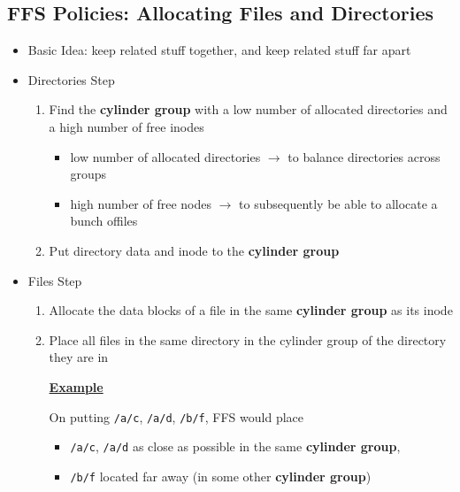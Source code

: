 \documentclass[12pt]{article}
\begin{document}
\subsection{FFS Policies: Allocating Files and Directories}

\begin{itemize}
    \item Basic Idea: keep related stuff together, and keep related stuff
    far apart
    \item Directories Step

    \begin{enumerate}[1)]
        \item Find the \textbf{cylinder group} with a low number of allocated directories
        and a high number of free inodes

        \begin{itemize}
            \item low number of allocated directories $\to$ to balance directories
            across groups
            \item high number of free nodes $\to$ to subsequently be able to allocate a bunch offiles
        \end{itemize}
        \item Put directory data and inode to the \textbf{cylinder group}
    \end{enumerate}

    \item Files Step

    \begin{enumerate}[1)]
        \item Allocate the data blocks of a file in the same \textbf{cylinder group} as its inode
        \item Place all files in the same directory in the cylinder group of the directory they are in

        \bigskip

        \underline{\textbf{Example}}

        \bigskip

        On putting \texttt{/a/c}, \texttt{/a/d}, \texttt{/b/f}, FFS would place

        \begin{itemize}
            \item \texttt{/a/c}, \texttt{/a/d} as close as possible in the same \textbf{cylinder group},
            \item \texttt{/b/f} located far away (in some other \textbf{cylinder group})
        \end{itemize}
    \end{enumerate}
\end{itemize}
\end{document}
